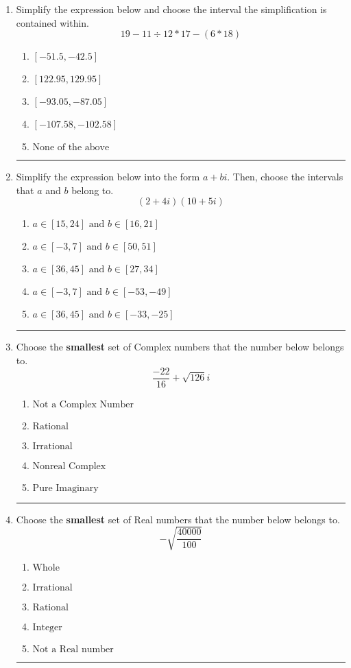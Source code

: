\documentclass[14pt]{extbook}
\newcommand{\litem}[1]{\item#1\hspace*{-1cm}\rule{\textwidth}{0.4pt}}
\begin{document}
\begin{enumerate}
\litem{
Simplify the expression below and choose the interval the simplification is contained within.\[ 19 - 11 \div 12 * 17 - (6 * 18) \]\begin{enumerate}[label=\Alph*.]
\item \( [-51.5, -42.5] \)
\item \( [122.95, 129.95] \)
\item \( [-93.05, -87.05] \)
\item \( [-107.58, -102.58] \)
\item \( \text{None of the above} \)

\end{enumerate} }
\litem{
Simplify the expression below into the form $a+bi$. Then, choose the intervals that $a$ and $b$ belong to.\[ (2 + 4 i)(10 + 5 i) \]\begin{enumerate}[label=\Alph*.]
\item \( a \in [15, 24] \text{ and } b \in [16, 21] \)
\item \( a \in [-3, 7] \text{ and } b \in [50, 51] \)
\item \( a \in [36, 45] \text{ and } b \in [27, 34] \)
\item \( a \in [-3, 7] \text{ and } b \in [-53, -49] \)
\item \( a \in [36, 45] \text{ and } b \in [-33, -25] \)

\end{enumerate} }
\litem{
Choose the \textbf{smallest} set of Complex numbers that the number below belongs to.\[ \frac{-22}{16}+\sqrt{126} i \]\begin{enumerate}[label=\Alph*.]
\item \( \text{Not a Complex Number} \)
\item \( \text{Rational} \)
\item \( \text{Irrational} \)
\item \( \text{Nonreal Complex} \)
\item \( \text{Pure Imaginary} \)

\end{enumerate} }
\litem{
Choose the \textbf{smallest} set of Real numbers that the number below belongs to.\[ -\sqrt{\frac{40000}{100}} \]\begin{enumerate}[label=\Alph*.]
\item \( \text{Whole} \)
\item \( \text{Irrational} \)
\item \( \text{Rational} \)
\item \( \text{Integer} \)
\item \( \text{Not a Real number} \)


\end{enumerate}}
\end{enumerate}
\end{document}
